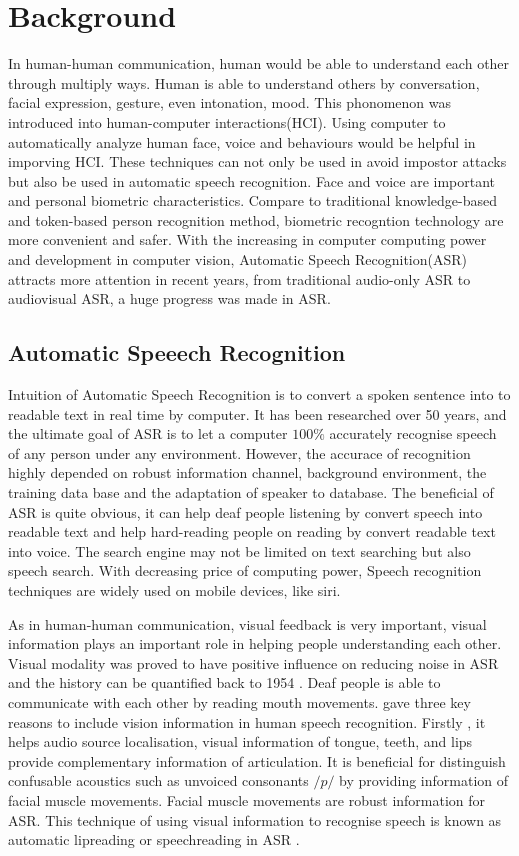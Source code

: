 \chapter{Background}
In human-human communication, human would be able to understand each other through multiply ways. Human is able to understand others by conversation, facial expression, gesture, even intonation, mood. This phonomenon was introduced into human-computer interactions(HCI). Using computer to automatically analyze human face, voice and behaviours would be helpful in imporving HCI. These techniques can not only be used in avoid impostor attacks\cite{aleksic2006audio} but also be used in automatic speech recognition\cite{potamianos2003recent}. Face and voice are important and personal biometric characteristics. Compare to traditional knowledge-based and token-based person recognition method, biometric recogntion technology are more convenient and safer. With the increasing in computer computing power and development in computer vision, Automatic Speech Recognition(ASR) attracts more attention in recent years, from traditional audio-only ASR to audiovisual ASR, a huge progress was made in ASR.

\section{Automatic Speeech Recognition}
Intuition of Automatic Speech Recognition is to convert a spoken sentence into to readable text in real time by computer. It has been researched over 50 years, and the ultimate goal of ASR is to let a computer $100\%$ accurately recognise speech of any person under any environment. However, the accurace of recognition highly depended on robust information channel, background environment, the training data base and the adaptation of speaker to database. The beneficial of ASR is quite obvious, it can help deaf people listening by convert speech into readable text and help hard-reading people on reading by convert readable text into voice. The search engine may not be limited on text searching but also speech search. With decreasing price of computing power, Speech recognition techniques are widely used on mobile devices, like siri.

As in human-human communication, visual feedback is very important, visual information plays an important role in helping people understanding each other. Visual modality was proved to have positive influence on reducing noise in ASR and the history can be quantified back to 1954 \cite{potamianos2003recent}. Deaf people is able to communicate with each other by reading mouth movements. \cite{potamianos2003recent} gave three key reasons to include vision information in human speech recognition. Firstly , it helps audio source localisation, visual information of tongue, teeth, and lips provide complementary information of articulation. It is beneficial for distinguish confusable acoustics such as unvoiced consonants $/p/$ by providing information of facial muscle movements. Facial muscle movements are robust information for ASR. This technique of using visual information to recognise speech is known as automatic lipreading or speechreading in ASR \cite{potamianos2003recent}.

